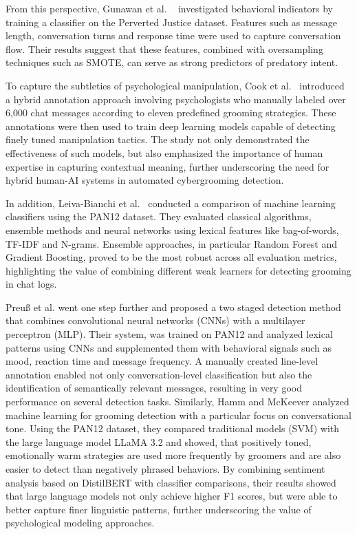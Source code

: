 From this perspective, Gunawan et al. \ \parencite{gunawan2016detecting} investigated behavioral indicators by training a classifier on the Perverted Justice dataset. Features such as message length, conversation turns and response time were used to capture conversation flow. Their results suggest that these features, combined with oversampling techniques such as SMOTE, can serve as strong predictors of predatory intent.

To capture the subtleties of psychological manipulation, Cook et al.\ \parencite{cook2023protecting} introduced a hybrid annotation approach involving psychologists who manually labeled over 6,000 chat messages according to eleven predefined grooming strategies. These annotations were then used to train deep learning models capable of detecting finely tuned manipulation tactics. The study not only demonstrated the effectiveness of such models, but also emphasized the importance of human expertise in capturing contextual meaning, further underscoring the need for hybrid human-AI systems in automated cybergrooming detection.


In addition, Leiva-Bianchi et al.\ \parencite{leiva2024meta} conducted a comparison of machine learning classifiers using the PAN12 dataset. They evaluated classical algorithms, ensemble methods and neural networks using lexical features like bag-of-words, TF-IDF and N-grams. Ensemble approaches, in particular Random Forest and Gradient Boosting, proved to be the most robust across all evaluation metrics, highlighting the value of combining different weak learners for detecting grooming in chat logs.

Preuß et al. \parencite{preuss2021automatically} went one step further and proposed a two staged detection method that combines convolutional neural networks (CNNs) with a multilayer perceptron (MLP). Their system, was trained on PAN12 and analyzed lexical patterns using CNNs and supplemented them with behavioral signals such as mood, reaction time and message frequency. A manually created line-level annotation enabled not only conversation-level classification but also the identification of semantically relevant messages, resulting in very good performance on several detection tasks. Similarly, Hamm and McKeever \parencite{hamm2025llms} analyzed machine learning for grooming detection with a particular focus on conversational tone. Using the PAN12 dataset, they compared traditional models (SVM) with the large language model LLaMA 3.2 and showed, that positively toned, emotionally warm strategies are used more frequently by groomers and are also easier to detect than negatively phrased behaviors. By combining sentiment analysis based on DistilBERT with classifier comparisons, their results showed that large language models not only achieve higher F1 scores, but  were able to better capture finer linguistic patterns, further underscoring the value of psychological modeling approaches.

